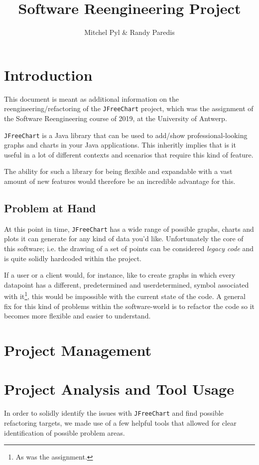 \documentclass[11pt]{article}
\begin{document}
	\title{Software Reengineering Project}
	\author{Mitchel Pyl \& Randy Paredis}
	\date{}
	
	\maketitle
	
	\section{Introduction}
	This document is meant as additional information on the reengineering/refactoring of the \texttt{JFreeChart} project, which was the assignment of the \textsf{Software Reengineering} course of 2019, at the \textsf{University of Antwerp}.
	
	\texttt{JFreeChart} is a Java library that can be used to add/show professional-looking graphs and charts in your Java applications. This inheritly implies that is it useful in a lot of different contexts and scenarios that require this kind of feature.
	
	The ability for such a library for being flexible and expandable with a vast amount of new features would therefore be an incredible advantage for this.
	
	\subsection{Problem at Hand}
	At this point in time, \texttt{JFreeChart} has a wide range of possible graphs, charts and plots it can generate for any kind of data you'd like. Unfortunately the core of this software; i.e. the drawing of a set of points can be considered \textit{legacy code} and is quite solidly hardcoded within the project.
	
	If a user or a client would, for instance, like to create graphs in which every datapoint has a different, predetermined and userdetermined, symbol associated with it\footnote{As was the assignment.}, this would be impossible with the current state of the code. A general fix for this kind of problems within the software-world is to refactor the code so it becomes more flexible and easier to understand.
	
	\section{Project Management}
	
	\section{Project Analysis and Tool Usage}
	In order to solidly identify the issues with \texttt{JFreeChart} and find possible refactoring targets, we made use of a few helpful tools that allowed for clear identification of possible problem areas.
	
\end{document}

